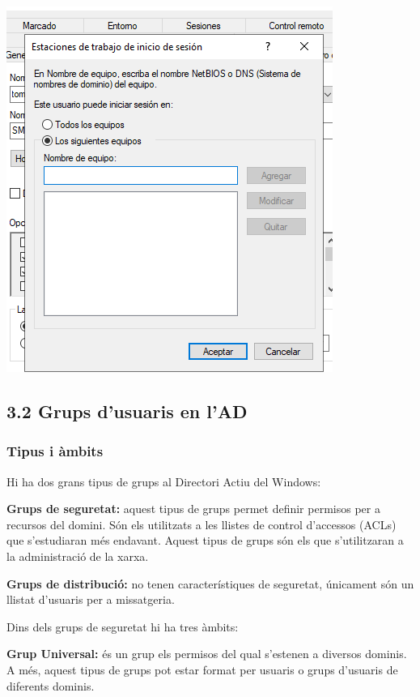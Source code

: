 \documentclass[
  a4paper,
]{article}
\begin{document}
\includegraphics{png/usuaris9.png}

\subsection{3.2 Grups d'usuaris en l'AD}\label{grups-dusuaris-en-lad}

\subsubsection{Tipus i àmbits}\label{tipus-i-uxe0mbits}

Hi ha dos grans tipus de grups al Directori Actiu del Windows:

\textbf{Grups de seguretat:} aquest tipus de grups permet definir
permisos per a recursos del domini. Són els utilitzats a les llistes de
control d'accessos (ACLs) que s'estudiaran més endavant. Aquest tipus de
grups són els que s'utilitzaran a la administració de la xarxa.

\textbf{Grups de distribució:} no tenen característiques de seguretat,
únicament són un llistat d'usuaris per a missatgeria.

Dins dels grups de seguretat hi ha tres àmbits:

\textbf{Grup Universal:} és un grup els permisos del qual s'estenen a
diversos dominis. A més, aquest tipus de grups pot estar format per
usuaris o grups d'usuaris de diferents dominis.
\end{document}
